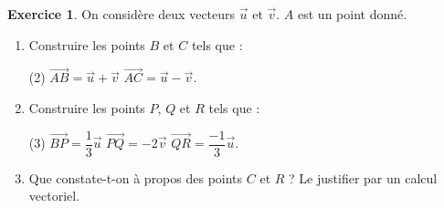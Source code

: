 \documentclass{exam}
\theoremstyle{definition}
\newtheorem{exercice}{Exercice}
\begin{document}
\newpage

\begin{center}
\end{center}

\begin{exercice}{}{}
On considère deux vecteurs $\vec u$ et $\vec v$. $A$ est un point donné.
\begin{enumerate}[label=\arabic*.]
\item Construire les points $B$ et $C$ tels que :
  \begin{tasks}[label=\textbullet](2)
  \task $\overrightarrow{AB}=\vec u+\vec v$
  \task $\overrightarrow{AC}=\vec u-\vec v$.
  \end{tasks}
\item Construire les points $P$, $Q$ et $R$ tels que :
  \begin{tasks}[label=\textbullet](3)
  \task $\overrightarrow{BP}=\dfrac13\vec u$
  \task $\overrightarrow{PQ}=-2\vec v$
  \task $\overrightarrow{QR}=\dfrac{-1}{3}\vec u$.
  \end{tasks}
\item Que constate-t-on à propos des points $C$ et $R$ ? Le justifier par un calcul vectoriel.
\end{enumerate}
\end{exercice}
\end{document}
